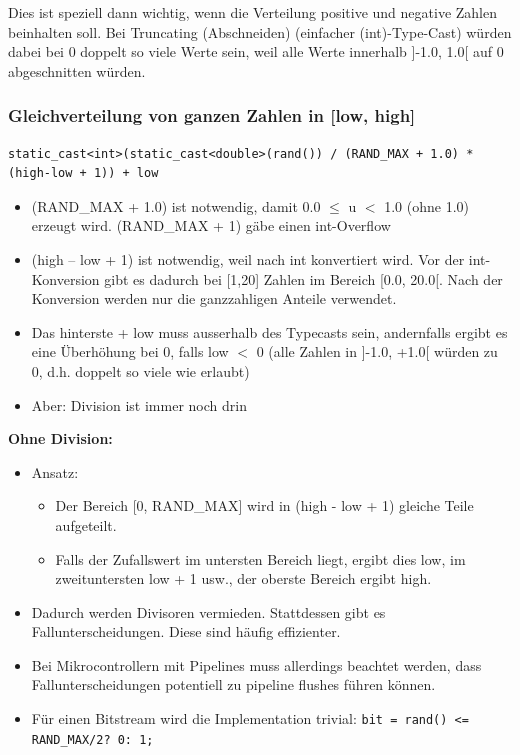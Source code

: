 Dies ist speziell dann wichtig, wenn die Verteilung positive und negative Zahlen beinhalten soll. Bei Truncating  (Abschneiden) (einfacher (int)-Type-Cast) würden dabei bei 0 doppelt so viele Werte sein, weil alle Werte innerhalb ]-1.0, 1.0[ auf 0 abgeschnitten würden.

\subsubsection{Gleichverteilung von ganzen Zahlen in [low, high]}
\begin{lstlisting}
static_cast<int>(static_cast<double>(rand()) / (RAND_MAX + 1.0) * (high-low + 1)) + low
\end{lstlisting}
\begin{itemize}
  \item (RAND\_MAX + 1.0) ist notwendig, damit 0.0  $\leq$ u $<$ 1.0 (ohne 1.0) erzeugt wird. (RAND\_MAX + 1) gäbe einen int-Overflow
  \item (high – low + 1) ist notwendig, weil nach int konvertiert wird. Vor der int-Konversion gibt es dadurch bei [1,20] Zahlen im Bereich [0.0, 20.0[. Nach der Konversion werden nur die ganzzahligen Anteile verwendet.
  \item Das hinterste + low muss ausserhalb des Typecasts sein, andernfalls ergibt es eine Überhöhung bei 0, falls low $<$ 0 (alle Zahlen in ]-1.0, +1.0[ würden zu 0, d.h. doppelt so viele wie erlaubt)
	\item Aber: Division ist immer noch drin
\end{itemize}

\textbf{Ohne Division:}

\begin{itemize}
	\item Ansatz:
	\begin{itemize}
		\item Der Bereich [0, RAND\_MAX] wird in (high - low + 1) gleiche Teile aufgeteilt.
		\item Falls der Zufallswert im untersten Bereich liegt, ergibt dies low, im zweituntersten low + 1 usw., der oberste Bereich ergibt high.
	\end{itemize}
	\item Dadurch werden Divisoren vermieden. Stattdessen gibt es Fallunterscheidungen. Diese sind häufig effizienter.
	\item Bei Mikrocontrollern mit Pipelines muss allerdings beachtet werden, dass Fallunterscheidungen potentiell zu pipeline flushes führen können.
	\item Für einen Bitstream wird die Implementation trivial: \lstinline{bit = rand() <= RAND_MAX/2? 0: 1;}
\end{itemize}

